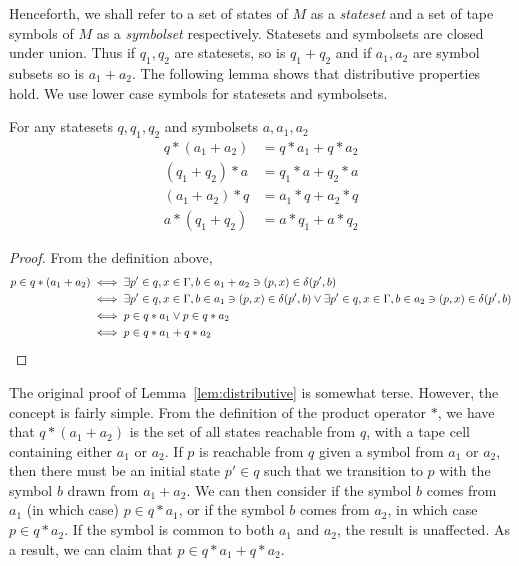 Henceforth, we shall refer to a set of states of $M$ as a \emph{stateset} and a set of tape symbols
of $M$ as a \emph{symbolset} respectively.
Statesets and symbolsets are closed under union.
Thus if $q_1, q_2$ are statesets, so is $q_1 + q_2$ and if $a_1, a_2$ are symbol subsets so is $a_1+a_2$.
The following lemma shows that distributive properties hold.
We use lower case symbols for statesets
and symbolsets.


\begin{lemma}\label{lem:distributive}
For any statesets $q, q_1, q_2$ and symbolsets $a, a_1, a_2$
\begin{align*}
    q*(a_1+a_2) &= q*a_1+q*a_2 \\
    (q_1 + q_2) * a &= q_1 * a + q_2 * a \\
    (a_1 + a_2) * q &= a_1 * q + a_2 * q \\
    a * (q_1 + q_2) &= a*q_1 + a*q_2
\end{align*}
\end{lemma}

\begin{proof}
    From the definition above,
    \begin{align*}
        p \in q * (a_1 + a_2) &\iff \exists p' \in q, x \in \Gamma, b \in a_1 + a_2 \ni (p,x) \in \delta(p', b) \\
        &\iff \exists p' \in q, x \in \Gamma, b \in a_1 \ni
        (p,x) \in \delta(p', b) \lor
        \exists p' \in q, x \in \Gamma, b \in a_2 \ni
        (p,x) \in \delta(p',b)\\
        &\iff p \in q * a_1 \lor p \in q * a_2 \\
        &\iff p \in q * a_1 + q * a_2
    \end{align*}
\end{proof}

\begin{aside}
    The original proof of Lemma~\ref{lem:distributive} is somewhat terse.
    However, the concept is fairly simple.
    From the definition of the product operator $*$, we have that
    $q * (a_1 + a_2)$ is the set of all states reachable from $q$, with
    a tape cell containing either $a_1$ or $a_2$.
    If $p$ is reachable from $q$ given a symbol from $a_1$ or $a_2$, then
    there must be an initial state $p' \in q$ such that we transition to
    $p$ with the symbol $b$ drawn from $a_1 + a_2$.
    We can then consider if the symbol $b$ comes from $a_1$ (in which case)
    $p \in q * a_1$, or if the symbol $b$ comes from $a_2$, in which case
    $p \in q * a_2$.
    If the symbol is common to both $a_1$ and $a_2$, the result is unaffected.
    As a result, we can claim that $p \in q*a_1 + q*a_2$.
\end{aside}

